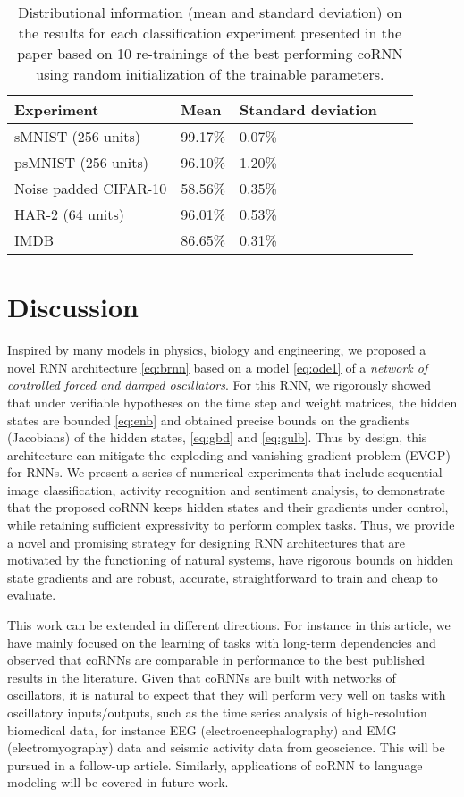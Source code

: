 \documentclass{article} \usepackage{iclr2021_conference,times}
\begin{document}
\begin{table}[h!]
  \caption{Distributional information (mean and standard deviation) on the results for each classification experiment presented in the paper based on 10 re-trainings of the best performing coRNN using random initialization of the trainable parameters.}
  \label{tab:distr_results}
  \centering
  \begin{tabular}{lllll}
    \toprule
    \cmidrule(r){1-3}
    Experiment & Mean & Standard deviation \\
        \midrule
    sMNIST (256 units) & 99.17\% & 0.07\% \\
    psMNIST (256 units) & 96.10\%& 1.20\% \\
    Noise padded CIFAR-10 & 58.56\% & 0.35\% \\
    HAR-2 (64 units) & 96.01\% & 0.53\%\\
    IMDB & 86.65\% & 0.31\% \\
    \bottomrule
  \end{tabular}
\end{table}

\section{Discussion}
Inspired by many models in physics, biology and engineering, we proposed a novel RNN architecture \eqref{eq:brnn} based on a model \eqref{eq:ode1} of a \emph{network of controlled forced and damped oscillators}. For this RNN, we rigorously showed that under verifiable hypotheses on the time step and weight matrices, the hidden states are bounded \eqref{eq:enb} and obtained precise bounds on the gradients (Jacobians) of the hidden states, \eqref{eq:gbd} and \eqref{eq:gulb}. Thus by design, this architecture can mitigate the exploding and vanishing gradient problem (EVGP) for RNNs. We present a series of numerical experiments that include sequential image classification, activity recognition and sentiment analysis, to demonstrate that the proposed coRNN keeps hidden states and their gradients under control, while retaining sufficient expressivity to perform complex tasks. Thus, we provide a novel and promising strategy for designing RNN architectures that are motivated by the functioning of natural systems, have rigorous bounds on hidden state gradients and are robust, accurate, straightforward to train and cheap to evaluate. 

This work can be extended in different directions. For instance in this article, we have mainly focused on the learning of tasks with long-term dependencies and observed that coRNNs are comparable in performance to the best published results in the literature. Given  that coRNNs are built with networks of oscillators, it is natural to expect that they will perform very well on tasks with oscillatory inputs/outputs, such as the time series analysis of high-resolution biomedical data, for instance EEG (electroencephalography) and EMG (electromyography) data and seismic activity data from geoscience. This will be pursued in a follow-up article. Similarly, applications of coRNN to language modeling will be covered in future work.
\end{document}
